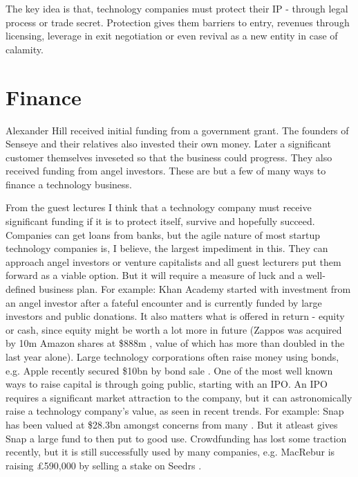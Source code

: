 \documentclass[twocolumn]{bmcart}%
\begin{document}
\par The key idea is that, technology companies must protect their IP - through legal process or trade secret. Protection gives them barriers to entry, revenues through licensing, leverage in exit negotiation or even revival as a new entity in case of calamity.

\section*{Finance}

Alexander Hill received initial funding from a government grant. The founders of Senseye and their relatives also invested their own money. Later a significant customer themselves inveseted so that the business could progress. They also received funding from angel investors. These are but a few of many ways to finance a technology business.\\

\par From the guest lectures I think that a technology company must receive significant funding if it is to protect itself, survive and hopefully succeed. Companies can get loans from banks, but the agile nature of most startup technology companies is, I believe, the largest impediment in this. They can approach angel investors or venture capitalists and all guest lecturers put them forward as a viable option. But it will require a measure of luck and a well-defined business plan. For example: Khan Academy started with investment from an angel investor after a fateful encounter and is currently funded by large investors and public donations. It also matters what is offered in return - equity or cash, since equity might be worth a lot more in future (Zappos was acquired by 10m Amazon shares at \$888m \cite{birchallwaters2009}, value of which has more than doubled in the last year alone). Large technology corporations often raise money using bonds, e.g. Apple recently secured \$10bn by bond sale \cite{platt2017}. One of the most well known ways to raise capital is through going public, starting with an IPO. An IPO requires a significant market attraction to the company, but it can astronomically raise a technology company's value, as seen in recent trends. For example: Snap has been valued at \$28.3bn \cite{bullockkuchler2017} amongst concerns from many \cite{masters2017}. But it atleast gives Snap a large fund to then put to good use. Crowdfunding has lost some traction recently, but it is still successfully used by many companies, e.g. MacRebur is raising £590,000 by selling a stake on Seedrs \cite{bounds2017}.\\
\end{document}
